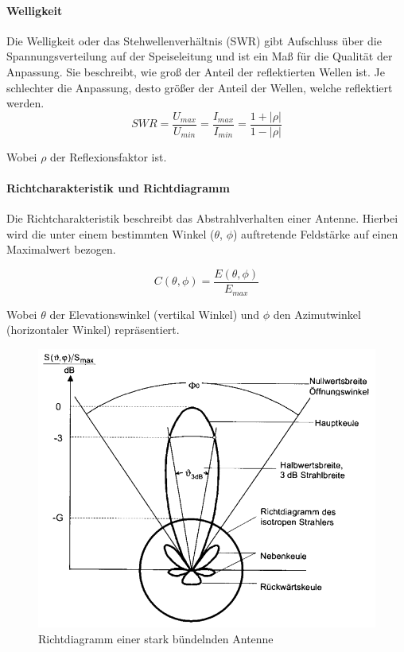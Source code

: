 \paragraph{Welligkeit}
Die Welligkeit oder das Stehwellenverhältnis (SWR) gibt Aufschluss über die Spannungsverteilung auf der Speiseleitung und ist ein Maß für die Qualität der Anpassung. Sie beschreibt, wie groß der Anteil der reflektierten Wellen ist. Je schlechter die Anpassung, desto größer der Anteil der Wellen, welche reflektiert werden.\\
\newline
\begin{equation}
	SWR=\frac{U_{max}}{U_{min}}=\frac{I_{max}}{I_{min}}=\frac{1+\lvert \rho \lvert}{1-\lvert \rho \lvert}
\end{equation}

Wobei $\rho$ der Reflexionsfaktor ist. 

\paragraph{Richtcharakteristik und Richtdiagramm}
Die Richtcharakteristik beschreibt das Abstrahlverhalten einer Antenne. Hierbei wird die unter einem bestimmten Winkel ($\theta$, $\phi$) auftretende Feldstärke auf einen Maximalwert bezogen.

\begin{equation}
	C(\theta, \phi)=\frac{E(\theta, \phi)}{E_{max}}
\end{equation}

Wobei $\theta$ der Elevationswinkel (vertikal Winkel) und $\phi$ den Azimutwinkel (horizontaler Winkel) repräsentiert.

\begin{figure}[H]
	\centering
	\includegraphics[width=\textwidth]{../ref/Richtdiagramm_Beispiel}
	\caption{Richtdiagramm einer stark bündelnden Antenne}
	\label{fig:Richtdiagramm Beispiel}
\end{figure}

